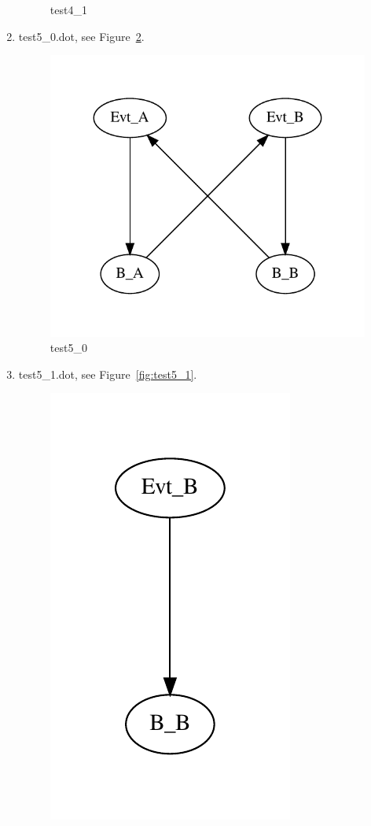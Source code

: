 \documentclass[12pt,a4paper]{report}
\begin{document}
\begin{enumerate}
\begin{figure}
        \caption{test4\_1}
        \label{fig:test4_1}
    \end{figure}
\item test5\_0.dot, see Figure~\ref{fig:test5_0}.
    \begin{figure}
        \centering 
        \includegraphics*[width=1.0\textwidth,keepaspectratio]{TestPattern/test5_0.pdf}
        \caption{test5\_0}
        \label{fig:test5_0}
    \end{figure}
\item test5\_1.dot, see Figure~\ref{fig:test5_1}.
    \begin{figure}
        \centering 
        \includegraphics{TestPattern/test5_1.pdf}

\end{figure}
\end{enumerate}
\end{document}

